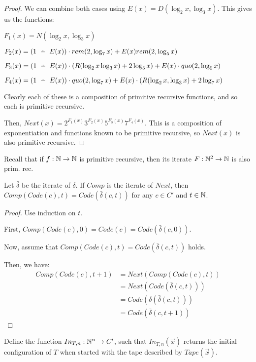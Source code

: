 \begin{proof}
We can combine both cases using $ E(x) = D(\log_2 x, \log_3 x) $. This gives us the functions:

$ F_1(x) = N(\log_2 x, \log_3 x) $

$ F_2(x) = (1 \monus E(x)) \cdot rem(2, \log_7 x) + E(x) rem(2, \log_5 x) $

$ F_3(x) = (1 \monus E(x)) \cdot (R(\log_2 x \log_3 x) + 2 \log_5 x) + E(x) \cdot quo(2, \log_5 x) $

$ F_4(x) = (1 \monus E(x)) \cdot quo(2, \log_7 x) + E(x) \cdot(R(\log_2 x, \log_3 x) + 2 \log_7 x) $

Clearly each of these is a composition of primitive recursive functions, and so each is primitive recursive.

Then, $ Next(x) = 2^{F_1(x)} 3^{F_2(x)} 5^{F_3(x)} 7^{F_4(x)} $. This is a composition of exponentiation and functions known to be primitive recursive, so $ Next(x) $ is also primitive recursive.

\end{proof}

Recall that if $ f: \mathbb{N} \to \mathbb{N} $ is primitive recursive, then its iterate $ F: \mathbb{N}^2 \to \mathbb{N} $ is also prim. rec.

Let $ \bar{\delta} $ be the iterate of $ \delta $. If $ Comp $ is the iterate of $ Next $, then $ Comp(Code(c), t) = Code(\bar{\delta}(c, t)) $ for any $ c \in C' $ and $ t \in \mathbb{N} $.
 
\begin{proof}
	Use induction on $ t $.
	
	First, $ Comp(Code(c), 0) = Code(c) = Code(\bar{\delta}(c, 0)) $.
	
	Now, assume that $ Comp(Code(c), t) = Code(\bar{\delta}(c, t)) $ holds.
	
	Then, we have:
	\begin{align*}
	Comp(Code(c), t + 1) &= Next(Comp(Code(c), t))\\
						 &= Next(Code(\bar{\delta}(c, t)))\\
						 &= Code(\delta(\bar{\delta}(c, t)))\\
						 &= Code(\bar{\delta}(c, t + 1))
	\end{align*}
\end{proof}

\newpage

Define the function $ In_{T, n}: \mathbb{N}^n \to C' $, such that $ In_{T, n}(\vec{x}) $ returns the initial configuration of $ T $ when started with the tape described by $ Tape(\vec{x}) $.

